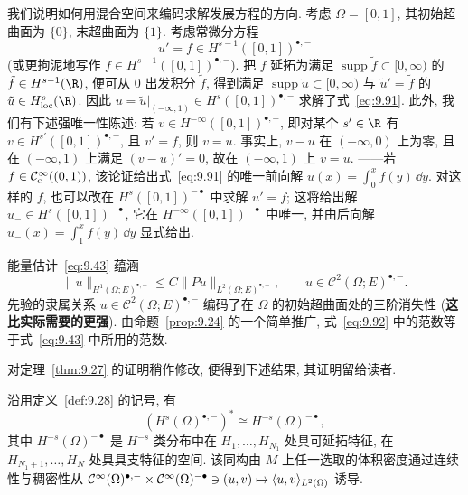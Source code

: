 \begin{example}[常微分方程初值问题]\label{eg:9.29}
我们说明如何用混合空间来编码求解发展方程的方向. 考虑 $\Omega = [0, 1]$, 其初始超曲面为 $\{0\}$, 末超曲面为 $\{1\}$. 考虑常微分方程
\begin{equation}\label{eq:9.91}
    u' = f \in H^{s-1}([0, 1])^{\bullet,-}
\end{equation}
(或更拘泥地写作 $f \in H^{s-1}([0, 1])^{\bullet,-}$). 把 $f$ 延拓为满足 $\operatorname{supp} \tilde f \subset [0, \infty)$ 的 $\tilde f \in H^{s-1}(\R)$, 便可从 $0$ 出发积分 $\tilde f$, 得到满足 $\operatorname{supp} \tilde u \subset [0, \infty)$ 与 $\tilde u' = \tilde f$ 的 $\tilde u \in H_{\mathrm{loc}}^s(\R)$. 因此 $u = \tilde u|_{(-\infty, 1)} \in H^s([0, 1])^{\bullet,-}$ 求解了式~\eqref{eq:9.91}. 此外, 我们有下述强唯一性陈述: 若 $v \in H^{-\infty}([0, 1])^{\bullet,-}$, 即对某个 $s' \in \R$ 有 $v \in H^{s'}([0, 1])^{\bullet,-}$, 且 $v' = f$, 则 $v = u$. 事实上, $v - u$ 在 $(-\infty, 0)$ 上为零, 且在 $(-\infty, 1)$ 上满足 $(v - u)' = 0$, 故在 $(-\infty, 1)$ 上 $v = u$. ——若 $f \in \mathcal{C}_{\mathrm{c}}^\infty((0, 1))$, 该论证给出式~\eqref{eq:9.91} 的唯一前向解 $u(x) = \int_0^x f(y) \, \dd y$. 对这样的 $f$, 也可以改在 $H^s([0, 1])^{-\bullet}$ 中求解 $u' = f$; 这将给出解 $u_- \in H^s([0, 1])^{-\bullet}$, 它在 $H^{-\infty}([0, 1])^{-\bullet}$ 中唯一, 并由后向解 $u_-(x) = \int_1^x f(y) \, \dd y$ 显式给出.
\end{example}

\begin{example}[能量估计]\label{eg:9.30}
能量估计~\eqref{eq:9.43} 蕴涵
\begin{equation}\label{eq:9.92}
    \|u\|_{H^1(\Omega; E)^{\bullet,-}} \le C \|P u\|_{L^2(\Omega; E)^{\bullet,-}}, \qquad u \in \mathcal{C}^2(\Omega; E)^{\bullet,-}.
\end{equation}
先验的隶属关系 $u \in \mathcal{C}^2(\Omega; E)^{\bullet,-}$ 编码了在 $\Omega$ 的初始超曲面处的三阶消失性 (\textbf{这比实际需要的更强}). 由命题~\ref{prop:9.24} 的一个简单推广, 式~\eqref{eq:9.92} 中的范数等于式~\eqref{eq:9.43} 中所用的范数.
\end{example}

对定理~\ref{thm:9.27} 的证明稍作修改, 便得到下述结果, 其证明留给读者.

\begin{theorem}[对偶空间]\label{thm:9.31}
沿用定义~\ref{def:9.28} 的记号, 有
\begin{equation}\label{eq:9.93}
    \left( H^s(\Omega)^{\bullet,-} \right)^* \cong H^{-s}(\Omega)^{-\bullet},
\end{equation}
其中 $H^{-s}(\Omega)^{-\bullet}$ 是 $H^{-s}$ 类分布中在 $H_1, \ldots, H_{N_1}$ 处具可延拓特征, 在 $H_{N_1+1}, \ldots, H_N$ 处具具支特征的空间. 该同构由 $M$ 上任一选取的体积密度通过连续性与稠密性从 $\mathcal{C}^\infty(\Omega)^{\bullet,-} \times \mathcal{C}^\infty(\Omega)^{-\bullet} \ni (u, v) \mapsto \langle u, v\rangle_{L^2(\Omega)}$ 诱导.
\end{theorem}

